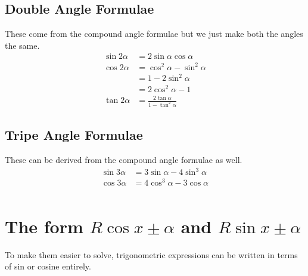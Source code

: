 \documentclass[class=article, crop=false]{standalone}
\begin{document}
\subsection*{Double Angle Formulae}
These come from the compound angle formulae but we just make both the angles the same. 
\begin{align*}
\sin 2 \alpha & = 2 \sin \alpha \cos \alpha \\ 
\cos 2 \alpha & = \cos^2 \alpha - \sin^2 \alpha \\
& = 1 - 2 \sin^2 \alpha \\
& = 2 \cos^2 \alpha - 1 \\ 
\tan 2 \alpha & = \frac{2 \tan \alpha}{1 - \tan^2 \alpha}
\end{align*}
\subsection*{Tripe Angle Formulae}
These can be derived from the compound angle formulae as well. 
\begin{align*}
\sin 3 \alpha & = 3 \sin \alpha - 4 \sin^3 \alpha \\
\cos 3 \alpha & = 4 \cos^3 \alpha - 3 \cos \alpha \\
\end{align*}
\section*{The form $R\cos x \pm \alpha$ and $R \sin x \pm \alpha$}
To make them easier to solve, trigonometric expressions can be written in terms of sin or cosine entirely. 
\end{document}
